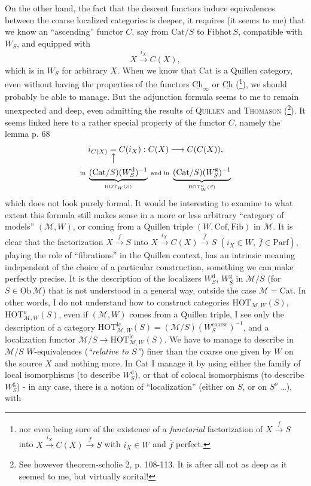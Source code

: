 \documentclass[11pt]{article}
\newcommand{\printedpage}[1]{\marginpar{\footnotesize p.~#1}}
\newcommand{\msp}[1]{\marginpar{\footnotesize [#1]}}
\newcommand{\usl}[1]{\underline{\mathrm{#1}}}
\begin{document}
\printedpage{52}
On the other hand, the fact that the descent functors induce equivalences between the coarse localized categories is deeper, it requires (it seems to me) that we know an ``ascending'' functor $C$, say from $\mathrm{Cat}/S$ to $\usl{Fibhot}\,S$, compatible with $W_S$, and equipped with
\[
X \xrightarrow{i_X} C(X),
\]
which is in $W_S$ for arbitrary $X$. When we know that Cat is a Quillen category, even without having the properties of the functors $\usl{Ch}_\infty$ or $\usl{Ch}$ (\footnote[52]{nor even being sure of the existence of a \textit{functorial} factorization of $X \xrightarrow{f} S$ into $X \xrightarrow{i_X} C(X) \xrightarrow{\bar{f}} S$ with $i_X \in W$ and $\bar{f}$ perfect.}), we should probably
\msp{page 82}
be able to manage. But the adjunction formula seems to me to remain unexpected and deep, even admitting the results of \textsc{Quillen} and \textsc{Thomason} (\footnote[53]{See however theorem-scholie 2, p. 108-113. It is after all not as deep as it seemed to me, but virtually sorital!}). It seems linked here to a rather special property of the functor $C$, namely the lemma p. 68
\[
\begin{gathered}
i_{C(X)} \underset{\big\uparrow}{=} C(i_X) : C(X) \longrightarrow C(C(X)),\\
\scriptstyle \text{in } \underbrace{(\mathrm{Cat}/S)(W_S^{\mathrm{d}})^{-1}}_{\mathrm{HOT}_W(S)} \text{ and in } \underbrace{(\mathrm{Cat}/S)(W_S^{\mathrm{g}})^{-1}}_{\mathrm{HOT}^{o}_{W}(S)}
\end{gathered}
\]
which does not look purely formal. It would be interesting to examine to what extent this formula still makes sense in a more or less arbitrary ``category of models'' $(\mathcal{M},W)$, or coming from a Quillen triple $(W,\mathrm{Cof},\mathrm{Fib})$ in $\mathcal{M}$. It is clear that the factorization $X \xrightarrow{f} S$ into $X \xrightarrow{i_X} C(X) \xrightarrow{\bar{f}} S$ $(i_X \in W,\ \bar{f} \in \mathrm{Parf})$, playing the role of ``fibrations'' in the Quillen context, has an intrinsic meaning independent of the choice of a particular construction, something we can make perfectly precise. It is the description of the localizers $W_S^{\mathrm{d}}$, $W_S^{\mathrm{g}}$ in $\mathcal{M}/S$ (for $S \in \mathrm{Ob}\,\mathcal{M}$) that is not understood in a general way, outside the case $\mathcal{M} = \mathrm{Cat}$. In other words, I do not understand how to construct categories $\mathrm{HOT}_{\mathcal{M},W}(S)$, $\mathrm{HOT}^{o}_{\mathcal{M},W}(S)$, even if $(\mathcal{M},W)$ comes from a Quillen triple, I see only the description of a category $\mathrm{HOT}^{\mathrm{lc}}_{\mathcal{M},W}(S) = (\mathcal{M}/S)(W_S^{\text{coarse}})^{-1}$, and a localization functor $\mathcal{M}/S \longrightarrow \mathrm{HOT}^{\mathrm{lc}}_{\mathcal{M},W}(S)$. We have to manage to describe in $\mathcal{M}/S$ $W$-equivalences (\textit{``relative to $S$''}) finer than the coarse one given by $W$ on the source $X$ and nothing more. In Cat I manage it by using either the family of local isomorphisms (to describe $W_S^{\mathrm{d}}$), or that of colocal isomorphisms (to describe $W_S^{\mathrm{g}}$) - in any case, there is a notion of ``localization'' (either on $S$, or on $S^{o}$ \dots), with %
\end{document}
